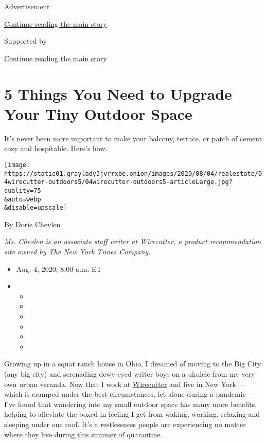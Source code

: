 Advertisement

\protect\hyperlink{after-top}{Continue reading the main story}

Supported by

\protect\hyperlink{after-sponsor}{Continue reading the main story}

\hypertarget{5-things-you-need-to-upgrade-your-tiny-outdoor-space}{%
\section{5 Things You Need to Upgrade Your Tiny Outdoor
Space}\label{5-things-you-need-to-upgrade-your-tiny-outdoor-space}}

It's never been more important to make your balcony, terrace, or patch
of cement cozy and hospitable. Here's how.

\texttt{[image: https://static01.graylady3jvrrxbe.onion/images/2020/08/04/realestate/04wirecutter-outdoors5/04wirecutter-outdoors5-articleLarge.jpg?quality=75\\\&auto=webp\\\&disable=upscale]}

By Dorie Chevlen

\emph{Ms. Chevlen is an associate staff writer at Wirecutter, a product
recommendation site owned by The New York Times Company.}

\begin{itemize}
\item
  Aug. 4, 2020, 8:00 a.m. ET
\item
  \begin{itemize}
  \item
  \item
  \item
  \item
  \item
  \item
  \end{itemize}
\end{itemize}

Growing up in a squat ranch house in Ohio, I dreamed of moving to the
Big City (any big city) and serenading dewy-eyed writer boys on a
ukulele from my very own urban veranda. Now that I work at
\href{http://www.nytimes3xbfgragh.onion/wirecutter?utm_source=nytimes\&utm_medium=referral\&utm_campaign=outdoor-space}{Wirecutter}
and live in New York --- which is cramped under the best circumstances,
let alone during a pandemic --- I've found that wandering into my small
outdoor space has many more benefits, helping to alleviate the boxed-in
feeling I get from waking, working, relaxing and sleeping under one
roof. It's a restlessness people are experiencing no matter where they
live during this summer of quarantine.

